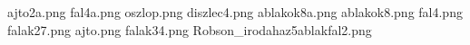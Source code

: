 ajto2a.png
fal4a.png
oszlop.png
diszlec4.png
ablakok8a.png
ablakok8.png
fal4.png
falak27.png
ajto.png
falak34.png
Robson_irodahaz5ablakfal2.png
